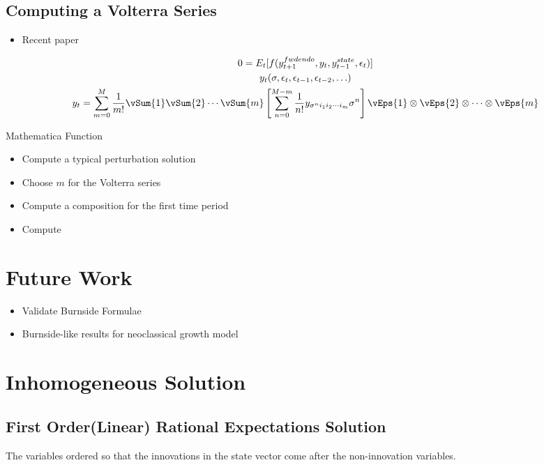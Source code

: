 \documentclass[12pt]{article}
\begin{document}
\subsection{Computing a Volterra Series}


{

  \begin{itemize}
  \item Recent paper\cite{meyer-gohde10,lan13} 
  \end{itemize}
    \begin{gather*}
0=E_t [ f(y_{t+1}^{fwdendo},y_t,y_{t-1}^{state},\epsilon_t)]\\
y_t(\sigma,\epsilon_{t},\epsilon_{t-1},\epsilon_{t-2},\ldots)\\
      y_t= \sum_{m=0}^M\frac{1}{m!} \vSum{1}\vSum{2}\cdots\vSum{m}\left [ \sum_{n=0}^{M-m} \frac{1}{n!} y_{\sigma^n i_1 i_2\cdots i_m}\sigma^n\right ] \vEps{1}\otimes \vEps{2} \otimes \cdots \otimes \vEps{m}
    \end{gather*}
}


{Mathematica Function}
   \begin{itemize}
   \item Compute a typical perturbation solution
   \item Choose $m$ for the Volterra series
   \item Compute a composition for the first time period
   \item Compute 
   \end{itemize}



\section{Future Work}
\label{sec:future-work}

\begin{itemize}
\item Validate Burnside Formulae
\item Burnside-like results for neoclassical growth model
\end{itemize}
\appendix

\section{Inhomogeneous Solution}
\label{sec:inhom-solut}



\subsection{First Order(Linear) Rational Expectations Solution}
\label{sec:firstlinrat}
The variables ordered so that the innovations  in the state vector come
after the  non-innovation variables.
\end{document}
